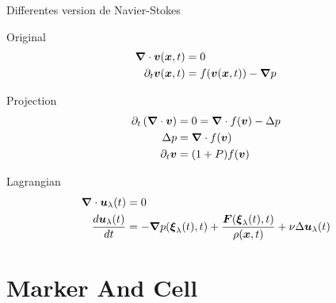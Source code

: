 \begin{frame}{Differentes version de Navier-Stokes}
 \begin{block}{Original}
 \begin{align*}
  {\boldsymbol {\nabla}} \cdot {\boldsymbol {v}}({\boldsymbol {x}} ,t)&=0\\
\partial_t {\boldsymbol {v}}({\boldsymbol {x}} ,t)&=f({\boldsymbol {v}}({\boldsymbol {x}},t))-{\boldsymbol {\nabla}}p
\end{align*}
 \end{block}
 \begin{block}{Projection}
 \begin{align*}
    \partial_t \left({\boldsymbol {\nabla}}\cdot {\boldsymbol {v}}\right)&=0={\boldsymbol {\nabla}}\cdot f({\boldsymbol {v}})-\Delta p\\
  \Delta p&={\boldsymbol {\nabla}}\cdot f({\boldsymbol {v}})\\
  \partial_t {\boldsymbol {v}}&=(1+P)f({\boldsymbol {v}})
  \end{align*}
 \end{block}

 \begin{block}{Lagrangian}
  \begin{align*}
{\boldsymbol {\nabla}} \cdot {\boldsymbol {u}}_{\lambda}(t)&=0\\
\frac{d {\boldsymbol {u}}_{\lambda}(t)}{d t}&=-{\boldsymbol {\nabla}} p({\boldsymbol {\xi}}_{\lambda}(t),t)+\frac{{\boldsymbol {F}}({\boldsymbol {\xi}}_{\lambda}(t),t)}{\rho({\boldsymbol {x}},t)}+\nu \Delta {\boldsymbol {u}}_{\lambda}(t)
 \end{align*}
 \end{block}


\end{frame}

\section{Marker And Cell}
